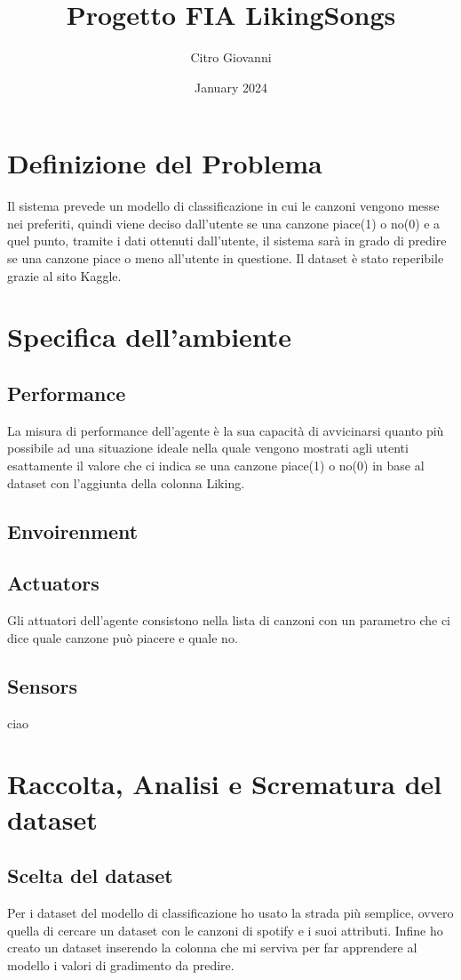 \documentclass[acmsmall, 10pt]{acmart}
\title{Progetto FIA LikingSongs}
\author{Citro Giovanni}
\date{January 2024}
\begin{document}
\maketitle

\section{Definizione del Problema}
Il sistema prevede un modello di classificazione in cui le canzoni vengono messe nei preferiti, quindi viene deciso dall'utente se una canzone piace(1) o no(0) e a quel punto, tramite i dati ottenuti dall'utente, il sistema sarà in grado di predire se una canzone piace o meno all'utente in questione.
Il dataset è stato reperibile grazie al sito Kaggle.
\\
\section{Specifica dell'ambiente}
\subsection{Performance}
La misura di performance dell’agente è la sua capacità di avvicinarsi quanto
più possibile ad una situazione ideale nella quale vengono mostrati agli utenti
esattamente il valore che ci indica se una canzone piace(1) o no(0) in base al dataset con l'aggiunta della colonna Liking.
\subsection{Envoirenment}

\subsection{Actuators}
Gli attuatori dell’agente consistono nella lista di canzoni con un parametro che ci dice quale canzone può piacere e quale no.

\subsection{Sensors}
ciao
\\
\section{Raccolta, Analisi e Scrematura del dataset}
\subsection{Scelta del dataset}
Per i dataset del modello di classificazione ho usato la strada più semplice, ovvero quella di cercare un dataset con le canzoni di spotify e i suoi attributi. Infine ho creato un dataset inserendo la colonna che mi serviva per far apprendere al modello i valori di gradimento da predire.
\end{document}
